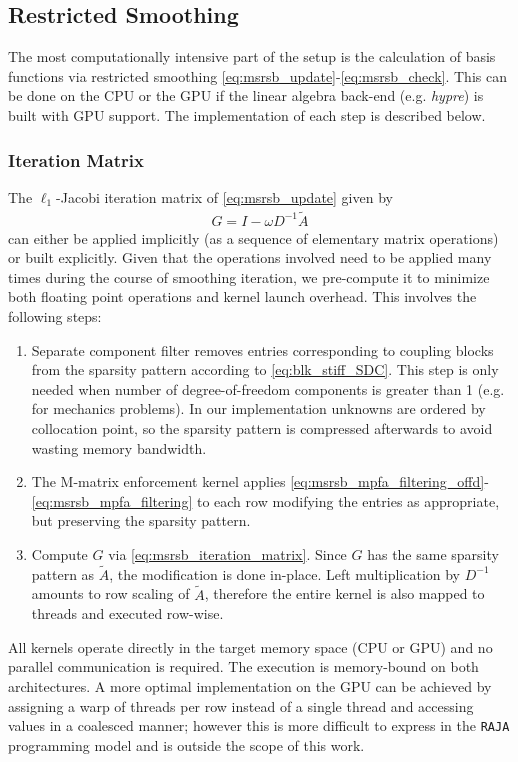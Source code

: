\subsection{Restricted Smoothing}
\label{subsec:par_kernels_msrsb}

The most computationally intensive part of the setup is the calculation of basis functions via restricted smoothing \eqref{eq:msrsb_update}-\eqref{eq:msrsb_check}.   This can be done on the CPU or the GPU if the linear algebra back-end (e.g. \textit{hypre}) is built with GPU support.   The implementation of each step is described below.

\subsubsection{Iteration Matrix}
\label{subsubsec:par_kernels_msrsb_matrix}

The $\ell_1$-Jacobi iteration matrix of \eqref{eq:msrsb_update} given by 
\begin{align}
    G = I - \omega D^{-1} \widetilde{A}
    \label{eq:msrsb_iteration_matrix}
\end{align}
can either be applied implicitly (as a sequence of elementary matrix operations) or built explicitly.   Given that the operations involved need to be applied many times during the course of smoothing iteration, we pre-compute it to minimize both floating point operations and kernel launch overhead.   This involves the following steps:
\begin{enumerate}
    \item Separate component filter removes entries corresponding to coupling blocks from the sparsity pattern according to \eqref{eq:blk_stiff_SDC}.   This step is only needed when number of degree-of-freedom components is greater than 1 (e.g. for mechanics problems).   In our implementation unknowns are ordered by collocation point, so the sparsity pattern is compressed afterwards to avoid wasting memory bandwidth.
    \item The M-matrix enforcement kernel applies \eqref{eq:msrsb_mpfa_filtering_offd}-\eqref{eq:msrsb_mpfa_filtering} to each row modifying the entries as appropriate, but preserving the sparsity pattern.
    \item Compute $G$ via \eqref{eq:msrsb_iteration_matrix}.   Since $G$ has the same sparsity pattern as $\widetilde{A}$, the modification is done in-place.   Left multiplication by $D^{-1}$ amounts to row scaling of $\widetilde{A}$, therefore the entire kernel is also mapped to threads and executed row-wise.
\end{enumerate}
All kernels operate directly in the target memory space (CPU or GPU) and no parallel communication is required.   The execution is memory-bound on both architectures.    A more optimal implementation on the GPU can be achieved by assigning a warp of threads per row instead of a single thread and accessing values in a coalesced manner; however this is more difficult to express in the \texttt{RAJA} programming model and is outside the scope of this work.

